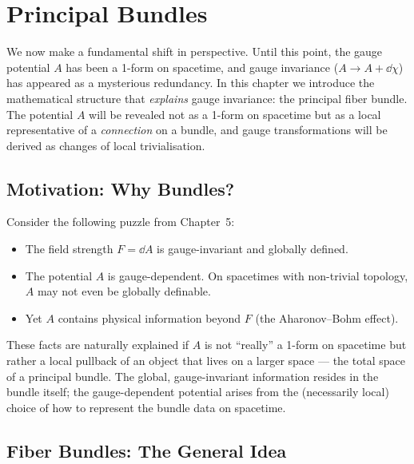 \chapter{Principal Bundles}

We now make a fundamental shift in perspective. Until this point, the gauge potential $A$ has been a 1-form on spacetime, and gauge invariance ($A \to A + \dd\chi$) has appeared as a mysterious redundancy. In this chapter we introduce the mathematical structure that \emph{explains} gauge invariance: the principal fiber bundle. The potential $A$ will be revealed not as a 1-form on spacetime but as a local representative of a \emph{connection} on a bundle, and gauge transformations will be derived as changes of local trivialisation.

\section{Motivation: Why Bundles?}

Consider the following puzzle from Chapter~5:
\begin{itemize}
\item The field strength $F = \dd A$ is gauge-invariant and globally defined.
\item The potential $A$ is gauge-dependent. On spacetimes with non-trivial topology, $A$ may not even be globally definable.
\item Yet $A$ contains physical information beyond $F$ (the Aharonov--Bohm effect).
\end{itemize}

These facts are naturally explained if $A$ is not ``really'' a 1-form on spacetime but rather a local pullback of an object that lives on a larger space --- the total space of a principal bundle. The global, gauge-invariant information resides in the bundle itself; the gauge-dependent potential arises from the (necessarily local) choice of how to represent the bundle data on spacetime.

\section{Fiber Bundles: The General Idea}

